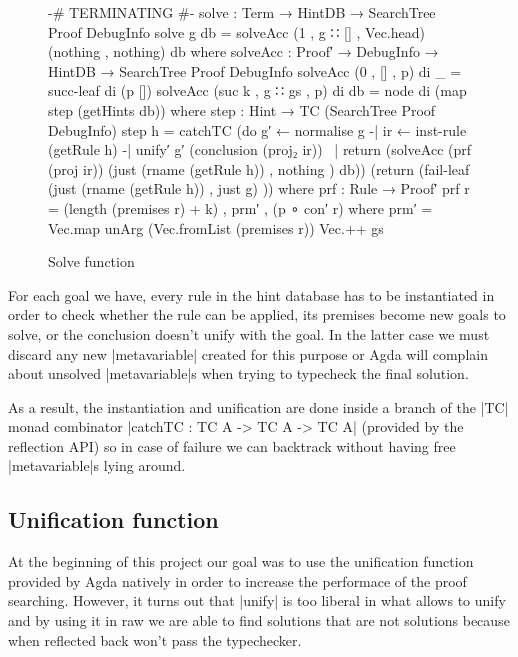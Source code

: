 \documentclass[a4paper]{article}
\begin{document}
\begin{figure}[h]
\small
\begin{code}
  {-# TERMINATING #-}
  solve : Term → HintDB → SearchTree Proof DebugInfo
  solve g db = solveAcc (1 , g ∷ [] , Vec.head) (nothing , nothing) db
    where
      solveAcc : Proof′ → DebugInfo → HintDB → SearchTree Proof DebugInfo
      solveAcc (0     ,     [] , p) di _  = succ-leaf di (p [])
      solveAcc (suc k , g ∷ gs , p) di db = node di (map step (getHints db))
        where
          step : Hint → TC (SearchTree Proof DebugInfo)
          step h = catchTC (do g′  ← normalise g
                            -| ir  ← inst-rule (getRule h)
                            -| unify′ g′ (conclusion (proj₂ ir))
                            ~| return (solveAcc (prf (proj ir)) (just (rname (getRule h)) , nothing ) db))
                            (return (fail-leaf (just (rname (getRule h)) , just g) ))
            where
              prf : Rule → Proof′
              prf r = (length (premises r) + k) , prm′ , (p ∘ con′ r)
                where
                  prm′ = Vec.map unArg (Vec.fromList (premises r))
                          Vec.++ gs
\end{code}
  \label{fig:solve}
  \caption{Solve function}
\end{figure}

For each goal we have, every rule in the hint database has to be instantiated in
order to check whether the rule can be applied, its premises become new goals to
solve, or the conclusion doesn't unify with the goal. In the latter case we must
discard any new |metavariable| created for this purpose or Agda will complain
about unsolved |metavariable|s when trying to typecheck the final solution.

As a result, the instantiation and unification are done inside a branch of the
|TC| monad combinator |catchTC : TC A -> TC A -> TC A| (provided by the
reflection API) so in case of failure we can backtrack without having
free |metavariable|s lying around.

\subsection{Unification function}

At the beginning of this project our goal was to use the unification function
provided by Agda natively in order to increase the performace of the proof
searching. However, it turns out that |unify| is too liberal in what allows to
unify and by using it in raw we are able to find solutions that are not
solutions because when reflected back won't pass the typechecker.
\end{document}
